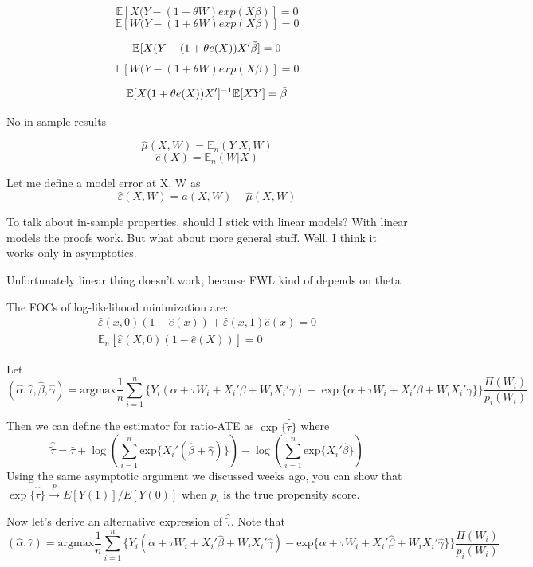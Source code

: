 \documentclass[a4paper,12pt]{article}
\theoremstyle{plain}
\begin{document}
    $$\mathbb{E}[X(Y - (1 + \theta W)exp(X\beta)] = 0$$
    $$\mathbb{E}[W(Y - (1 + \theta W)exp(X\beta)] = 0$$

    $$\mathbb{E}[X(Y - (1 + \theta e(X))X^\prime\Tilde \beta] = 0$$
    $$\mathbb{E}[W(Y - (1 + \theta W)exp(X\beta)] = 0$$

    
    $$\mathbb{E}[X(1 + \theta e(X))X^\prime]^{-1}\mathbb{E}[XY] = \Tilde \beta$$

    No in-sample results


    $$\hat \mu(X, W) = \mathbb{E}_n(Y | X, W)$$
    $$\hat e(X) = \mathbb{E}_n(W | X)$$

    Let me define a model error at X, W as
    $$\hat \varepsilon(X, W) = a(X, W) - \hat\mu(X, W)$$


    To talk about in-sample properties, should I stick with linear models? With linear models the proofs work. But what about more general stuff. Well, I think it works only in asymptotics.  

    Unfortunately linear thing doesn't work, because FWL kind of depends on theta.

The FOCs of log-likelihood minimization are:
\begin{gather*}
\hat \varepsilon(x, 0) (1 - \hat e(x)) + \hat \varepsilon(x, 1) \hat e(x) = 0 \\
\mathbb{E}_n[\hat \varepsilon(X, 0) (1 - \hat e(X))] = 0
\end{gather*}



Let
$$(\hat{\alpha}, \hat{\tau}, \hat{\beta}, \hat{\gamma}) = \mathrm{argmax}\frac{1}{n}\sum_{i=1}^{n}\{Y_i (\alpha + \tau W_i + X_i' \beta + W_i X_i' \gamma) - \exp\{\alpha + \tau W_i + X_i' \beta + W_i X_i' \gamma\}\}\frac{\Pi(W_i)}{p_i(W_i)}$$

Then we can define the estimator for ratio-ATE as $\exp\{\hat{\tilde{\tau}}\}$ where 
$$\hat{\tilde{\tau}} = \hat{\tau} + \log \left(\sum_{i=1}^{n}\mathrm{exp}\{X_i'(\hat{\beta} + \hat{\gamma})\}\right) - \log \left(\sum_{i=1}^{n}\mathrm{exp}\{X_i'\hat{\beta}\}\right)$$
Using the same asymptotic argument we discussed weeks ago, you can show that $\exp\{\hat{\tilde{\tau}}\}\stackrel{p}{\rightarrow} E[Y(1)] / E[Y(0)]$ when $p_i$ is the true propensity score. 

Now let's derive an alternative expression of $\hat{\tilde{\tau}}$. Note that 
$$(\hat{\alpha}, \hat{\tau}) = \mathrm{argmax}\frac{1}{n}\sum_{i=1}^{n}\{Y_i(\alpha + \tau W_i + X_i' \hat{\beta} + W_i X_i' \hat{\gamma}) - \mathrm{exp}\{\alpha + \tau W_i + X_i' \hat{\beta} + W_i X_i' \hat{\gamma}\}\}\frac{\Pi(W_i)}{p_i(W_i)}$$
\end{document}
